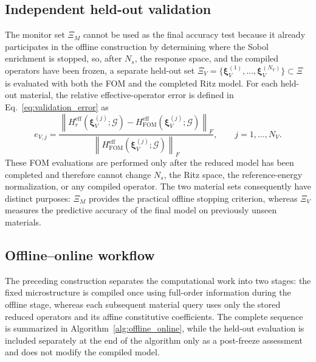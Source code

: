 \documentclass[pdflatex,sn-basic,Numbered]{sn-jnl}
\newcounter{algorithm}
\newcommand{\G}{\mathcal{G}}
\newcommand{\Hr}{H^{\mathrm{eff}}_r}
\newcommand{\Hfom}{H^{\mathrm{eff}}_{\mathrm{FOM}}}
\begin{document}
\subsection{Independent held-out validation}
\label{subsec:heldout_validation}

The monitor set \(\Xi_M\) cannot be used as the final accuracy test because it
already participates in the offline construction by determining where the
Sobol enrichment is stopped, so, after \(N_s\), the response space, and the
compiled operators have been frozen, a separate held-out set
\(\Xi_V=\{\boldsymbol\xi_V^{(1)},\ldots,
\boldsymbol\xi_V^{(N_V)}\}\subset\Xi\) is evaluated with both the FOM and the
completed Ritz model. For each held-out material, the relative
effective-operator error is defined in Eq.~\eqref{eq:validation_error} as
\begin{equation}
\label{eq:validation_error}
e_{V,j}
=
\frac{
\left\|
\Hr(\boldsymbol\xi_V^{(j)};\G)
-
\Hfom(\boldsymbol\xi_V^{(j)};\G)
\right\|_F
}{
\left\|
\Hfom(\boldsymbol\xi_V^{(j)};\G)
\right\|_F
},
\qquad
j=1,\ldots,N_V.
\end{equation}
These FOM evaluations are performed only after the reduced model has been
completed and therefore cannot change \(N_s\), the Ritz space, the
reference-energy normalization, or any compiled operator. The two material
sets consequently have distinct purposes: \(\Xi_M\) provides the practical
offline stopping criterion, whereas \(\Xi_V\) measures the predictive
accuracy of the final model on previously unseen materials.

\subsection{Offline--online workflow}
\label{subsec:offline_online}

The preceding construction separates the computational work into two stages:
the fixed microstructure is compiled once using full-order information during
the offline stage, whereas each subsequent material query uses only the
stored reduced operators and its affine constitutive coefficients. The complete
sequence is summarized in Algorithm~\ref{alg:offline_online}, while the
held-out evaluation is included separately at the end of the algorithm only
as a post-freeze assessment and does not modify the compiled model.
\end{document}
